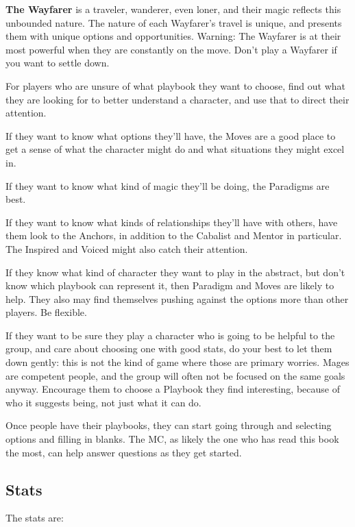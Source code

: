 \documentclass[10pt,twoside,openright]{memoir}
\begin{document}
\textbf{The Wayfarer} is a traveler, wanderer, even loner, and their
magic reflects this unbounded nature. The nature of each Wayfarer's
travel is unique, and presents them with unique options and
opportunities. Warning: The Wayfarer is at their most powerful when they
are constantly on the move. Don't play a Wayfarer if you want to settle
down.

For players who are unsure of what playbook they want to choose, find
out what they are looking for to better understand a character, and use
that to direct their attention.

If they want to know what options they'll have, the Moves are a good
place to get a sense of what the character might do and what situations
they might excel in.

If they want to know what kind of magic they'll be doing, the Paradigms
are best.

If they want to know what kinds of relationships they'll have with
others, have them look to the Anchors, in addition to the Cabalist and
Mentor in particular. The Inspired and Voiced might also catch their
attention.

If they know what kind of character they want to play in the abstract,
but don't know which playbook can represent it, then Paradigm and Moves
are likely to help. They also may find themselves pushing against the
options more than other players. Be flexible.

If they want to be sure they play a character who is going to be helpful
to the group, and care about choosing one with good stats, do your best
to let them down gently: this is not the kind of game where those are
primary worries. Mages are competent people, and the group will often
not be focused on the same goals anyway. Encourage them to choose a
Playbook they find interesting, because of who it suggests being, not
just what it can do.

Once people have their playbooks, they can start going through and
selecting options and filling in blanks. The MC, as likely the one who
has read this book the most, can help answer questions as they get
started.

\hypertarget{stats-10}{%
\subsection{Stats}\label{stats-10}}

The stats are:
\end{document}
